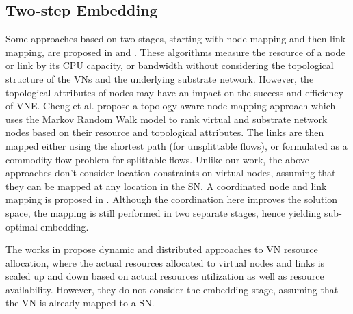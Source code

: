 \documentclass[journal]{IEEEtran}
\begin{document}
\subsection{Two-step Embedding}
Some approaches based on two stages, starting with node mapping and then link mapping, are proposed in \cite{Yu08} and \cite{Lu06}. These algorithms measure the resource of a node or link by its CPU capacity, or bandwidth without considering the topological structure of the VNs and the underlying substrate network. However, the topological attributes of nodes may have an impact on the success and efficiency of VNE. Cheng et al. \cite{ChengXiang2011} propose a topology-aware node mapping approach which uses the Markov Random Walk model to rank virtual and substrate network nodes based on their resource and topological attributes. The links are then mapped either using the shortest path (for unsplittable flows), or formulated as a commodity flow problem for splittable flows. Unlike our work, the above approaches don't consider location constraints on virtual nodes, assuming that they can be mapped at any location in the \ac{SN}. A coordinated node and link mapping is proposed in \cite{Chowdhury12}. Although the coordination here improves the solution space, the mapping is still performed in two separate stages, hence yielding sub-optimal embedding.

The works in \cite{He08, mijumbi1, mijumbi2, mijumbi3} propose dynamic and distributed approaches to \ac{VN} resource allocation, where the actual resources allocated to virtual nodes and links is scaled up and down based on actual resources utilization as well as resource availability. However, they do not consider the embedding stage, assuming that the \ac{VN} is already mapped to a \ac{SN}. 
\end{document}
